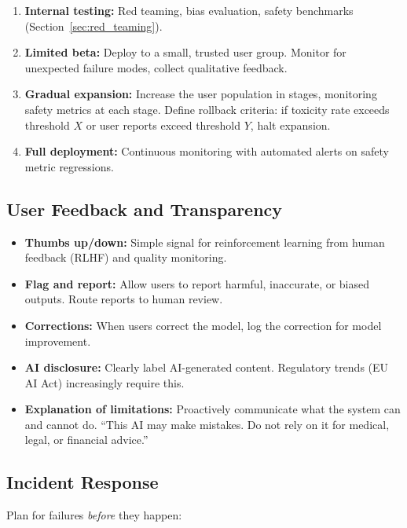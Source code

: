 \begin{enumerate}[label=\textbf{\arabic*.}]
    \item \textbf{Internal testing:} Red teaming, bias evaluation,
    safety benchmarks (Section~\ref{sec:red_teaming}).
    \item \textbf{Limited beta:} Deploy to a small, trusted user group.
    Monitor for unexpected failure modes, collect qualitative feedback.
    \item \textbf{Gradual expansion:} Increase the user population in
    stages, monitoring safety metrics at each stage.  Define rollback
    criteria: if toxicity rate exceeds threshold $X$ or user reports
    exceed threshold $Y$, halt expansion.
    \item \textbf{Full deployment:} Continuous monitoring with automated
    alerts on safety metric regressions.
\end{enumerate}

\subsection{User Feedback and Transparency}

\begin{itemize}
    \item \textbf{Thumbs up/down:} Simple signal for reinforcement learning
    from human feedback (RLHF) and quality monitoring.
    \item \textbf{Flag and report:} Allow users to report harmful, inaccurate,
    or biased outputs.  Route reports to human review.
    \item \textbf{Corrections:} When users correct the model, log the
    correction for model improvement.
    \item \textbf{AI disclosure:} Clearly label AI-generated content.
    Regulatory trends (EU AI Act) increasingly require this.
    \item \textbf{Explanation of limitations:} Proactively communicate what
    the system can and cannot do.  ``This AI may make mistakes.  Do not rely
    on it for medical, legal, or financial advice.''
\end{itemize}

\subsection{Incident Response}

Plan for failures \emph{before} they happen:


